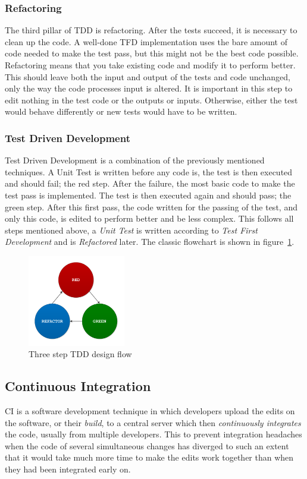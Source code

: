 \documentclass[11pt,british]{article}
\begin{document}
\subsubsection{Refactoring}
The third pillar of TDD is refactoring. After the tests succeed, it is necessary to clean up the code.\cite{refactoring} A well-done \gls{TFD} implementation uses the bare amount of code needed to make the test pass, but this might not be the best code possible. Refactoring means that you take existing code and modify it to perform better. This should leave both the input and output of the tests and code unchanged, only the way the code processes input is altered. It is important in this step to edit nothing in the test code or the outputs or inputs. Otherwise, either the test would behave differently or new tests would have to be written. 

\subsubsection{Test Driven Development}
Test Driven Development is a combination of the previously mentioned techniques. A Unit Test is written before any code is, the test is then executed and should fail; the red step. After the failure, the most basic code to make the test pass is implemented. The test is then executed again and should pass; the green step. After this first pass, the code written for the passing of the test, and only this code, is edited to perform better and be less complex. This follows all steps mentioned above, a \emph{Unit Test} is written according to \emph{Test First Development} and is \emph{Refactored} later. The classic flowchart is shown in figure~\ref{fig:TDD_Flow}.

\begin{figure}[h]
    \centering
	\includegraphics[width=0.38\textwidth]{images/tdd.pdf}
    \caption{Three step TDD design flow}
    \label{fig:TDD_Flow}
\end{figure}

\subsection{Continuous Integration}
\label{subsec:CI}
\gls{CI} is a software development technique in which developers upload the edits on the software, or their \emph{build}, to a central server which then \emph{continuously integrates} the code, usually from multiple developers. This to prevent integration headaches when the code of several simultaneous changes has diverged to such an extent that it would take much more time to make the edits work together than when they had been integrated early on.
\end{document}
